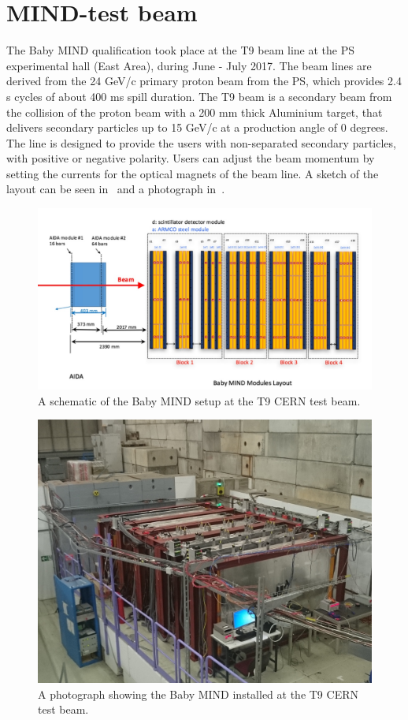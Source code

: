 \pagebreak
\section{MIND-test beam}

The Baby MIND qualification took place at the T9 beam line at the PS experimental hall (East Area), during June - July 2017. The beam lines are derived from the 24 GeV/c primary proton beam from the PS, which provides 2.4 s cycles of about 400 ms spill duration. The T9 beam is a secondary beam from the collision of the proton beam with a 200 mm thick Aluminium target, that delivers secondary particles up to 15 GeV/c at a production angle of 0 degrees. The line is designed to provide the users with non-separated secondary particles, with positive or negative polarity. Users can adjust the beam momentum by setting the currents for the optical magnets of the beam line. A sketch of the layout can be seen in~ and a photograph in~.

\begin{figure}[h!]
\centering
\includegraphics[width=\textwidth]{figures/MINDAIDAtestbeam.jpeg}
\caption{A schematic of the Baby MIND setup at the T9 CERN test beam.}
\label{fig:MINDtb}
\end{figure}

\begin{figure}[h!]
\centering
\includegraphics[width=\textwidth]{figures/DSC_2619.JPG}
\caption{A photograph showing the Baby MIND installed at the T9 CERN test beam.}
\label{fig:MINDtbreal}
\end{figure}

